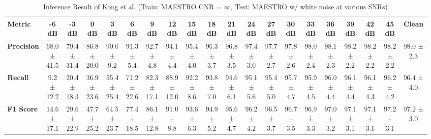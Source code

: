 \documentclass{article}
\begin{document}
\begin{table*}[htbp]
\centering
\caption{Inference Result of Kong et al. (Train: MAESTRO CNR = $\infty$, Test: MAESTRO w/ white noise at various SNRs)}
\begin{adjustbox}{max width=\textwidth}
\begin{tabular}{@{}lccccccccccccccccccc@{}}
\toprule
\textbf{Metric} & \textbf{-6 dB} & \textbf{-3 dB} & \textbf{0 dB} & \textbf{3 dB} & \textbf{6 dB} & \textbf{9 dB} & \textbf{12 dB} & \textbf{15 dB} & \textbf{18 dB} & \textbf{21 dB} & \textbf{24 dB} & \textbf{27 dB} & \textbf{30 dB} & \textbf{33 dB} & \textbf{36 dB} & \textbf{39 dB} & \textbf{42 dB} & \textbf{45 dB} & \textbf{Clean} \\ 
\midrule
\textbf{Precision} &  68.0 ± 41.5 & 79.4 ± 31.4 & 86.8 ± 20.0 & 90.0 ± 9.2 & 91.3 ± 5.4 & 92.7 ± 4.8 & 94.1 ± 4.4 & 95.4 ± 4.0 & 96.3 ± 3.7
& 96.8 ± 3.5 & 97.4 ± 3.0 & 97.7 ± 2.7 & 97.8 ± 2.6 & 98.0 ± 2.4 & 98.1 ± 2.3 & 98.2 ± 2.2 & 98.2 ± 2.2 & 98.2 ± 2.2 & 98.0 ± 2.3
\\
\textbf{Recall}    &  9.2 ± 12.2 & 20.4 ± 18.3 & 36.9 ± 23.6 & 55.4 ± 25.4 & 71.2 ± 22.6 & 82.3 ± 17.1 & 88.9 ± 12.0 & 92.2 ± 8.6 & 93.8 ± 7.0 & 94.6 ± 6.1 & 95.1 ± 5.6 & 95.4 ± 5.0 & 95.7 ± 4.7 & 95.9 ± 4.5 &
96.0 ± 4.4 & 96.1 ± 4.4 & 96.1 ± 4.3 & 96.2 ± 4.2 & 96.4 ± 4.0
 \\
\textbf{F1 Score} &  14.6 ± 17.1 & 29.6 ± 22.9 & 47.7 ± 25.2 &
64.5 ± 23.7 & 77.4 ± 18.5 & 86.1 ± 12.8 & 91.0 ± 8.8 & 93.6 ± 6.3 & 94.9 ± 5.2 &
95.6 ± 4.7 & 96.2 ± 4.2 & 96.5 ± 3.7 & 96.7 ± 3.5 & 96.9 ± 3.3 & 97.0 ± 3.2 &
97.1 ± 3.1 & 97.1 ± 3.1 & 97.2 ± 3.1 & 97.2 ± 3.0
 \\
\bottomrule
\end{tabular}
\end{adjustbox}
\end{table*}
\end{document}
